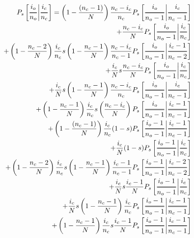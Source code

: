 \documentclass[preview]{standalone}
\newcommand{\Dfrac}[2]{%
  \ooalign{%
    $\genfrac{}{}{1.2pt}0{#1}{#2}$\cr%
    $\color{white}\genfrac{}{}{.4pt}0{\phantom{#1}}{\phantom{#2}}$}%
}
\newcommand{\cond}{\middle\vert}
\begin{document}
\begin{equation*}
  \begin{aligned}
    P_s\left[ \Dfrac{i_o}{n_o} \cond \Dfrac{i_c}{n_c} \right]
    = \left(1-\frac{(n_c-1)}{N}\right)\frac{n_c-i_c}{n_c} P_s\left[ \Dfrac{i_o}{n_o-1} \cond \Dfrac{i_c}{n_c-1} \right]& \\ %
    + \frac{n_c-i_c}{N} P_s\left[ \Dfrac{i_o}{n_o-1} \cond \Dfrac{i_c}{n_c} \right]& \\ %
    + \left(1-\frac{n_c-2}{N}\right) \frac{i_c}{n_c} s  \left(1-\frac{n_c-1}{N}\right) \frac{n_c-i_c}{n_c-1} P_s\left[ \Dfrac{i_o}{n_o-1} \cond \Dfrac{i_c-1}{n_c-2} \right]& \\ %
    + \frac{i_c}{N} s  \frac{n_c-i_c}{N}  P_s\left[ \Dfrac{i_o}{n_o-1} \cond \Dfrac{i_c}{n_c} \right] & \\ %
    + \frac{i_c}{N} s  \left(1-\frac{n_c-1}{N}\right) \frac{n_c-i_c}{n_c}  P_s\left[ \Dfrac{i_o}{n_o-1} \cond \Dfrac{i_c}{n_c-1} \right]& \\ %
    + \left(1-\frac{n_c-1}{N}\right) \frac{i_c}{n_c} s  \left(\frac{ n_c-i_c }{N}\right) P_s\left[ \Dfrac{i_o}{n_o-1} \cond \Dfrac{i_c-1}{n_c-1} \right]& \\ %
    + \left(1-\frac{(n_c-1)}{N}\right)\frac{i_c}{n_c} (1-s) P_s\left[ \Dfrac{i_o-1}{n_o-1} \cond \Dfrac{i_c-1}{n_c-1} \right]& \\ %
    + \frac{i_c}{N} (1-s) P_s\left[ \Dfrac{i_o-1}{n_o-1} \cond \Dfrac{i_c}{n_c} \right]& \\ %
    + \left(1-\frac{n_c-2}{N}\right) \frac{i_c}{n_c} s  \left(1-\frac{n_c-1}{N}\right) \frac{i_c-1}{n_c-1} P_s\left[ \Dfrac{i_o-1}{n_o-1} \cond \Dfrac{i_c-2}{n_c-2} \right]& \\ %
    + \frac{i_c}{N} s  \frac{i_c-1}{N}   P_s\left[ \Dfrac{i_o-1}{n_o-1} \cond \Dfrac{i_c}{n_c} \right]& \\ %
    + \frac{i_c}{N} s  \left(1-\frac{n_c-1}{N}\right) \frac{i_c}{n_c}   P_s\left[ \Dfrac{i_o-1}{n_o-1} \cond \Dfrac{i_c-1}{n_c-1} \right]& \\ %
    + \left(1-\frac{n_c-1}{N}\right) \frac{i_c}{n_c} s \frac{i_c-1}{N} P_s\left[ \Dfrac{i_o-1}{n_o-1} \cond \Dfrac{i_c-1}{n_c-1} \right] %
  \end{aligned}
\end{equation*}
\end{document}
